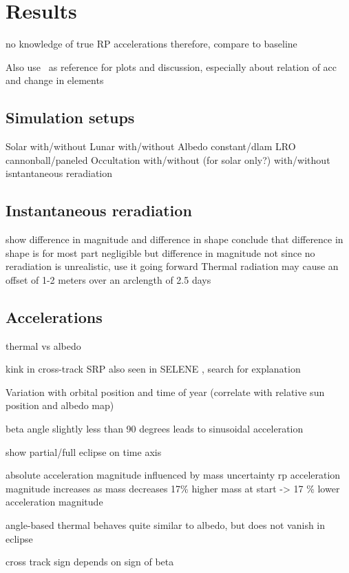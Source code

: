\section{Results}

no knowledge of true RP accelerations
therefore, compare to baseline

Also use~\cite{Borderies1990} as reference for plots and discussion, especially about relation of acc and change in elements

\subsection{Simulation setups}

Solar with/without
Lunar with/without
Albedo constant/dlam
LRO cannonball/paneled
Occultation with/without (for solar only?)
with/without isntantaneous reradiation

\subsection{Instantaneous reradiation}
show difference in magnitude and difference in shape
conclude that difference in shape is for most part negligible but difference in magnitude not
since no reradiation is unrealistic, use it going forward
Thermal radiation may cause an offset of 1-2 meters over an arclength of 2.5 days~\cite{Bauer2016}


\subsection{Accelerations}
thermal vs albedo

kink in cross-track SRP also seen in SELENE \cite{Kubooka1999}, search for explanation

Variation with orbital position and time of year (correlate with relative sun position and albedo map)

beta angle slightly less than 90 degrees leads to sinusoidal acceleration

show partial/full eclipse on time axis

absolute acceleration magnitude influenced by mass uncertainty
rp acceleration magnitude increases as mass decreases
17\% higher mass at start -> 17 \% lower acceleration magnitude

angle-based thermal behaves quite similar to albedo, but does not vanish in eclipse

cross track sign depends on sign of beta


